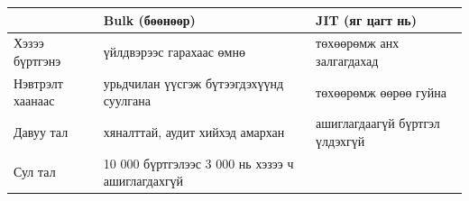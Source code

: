 \begingroup\scriptsize\begin{longtable}[]{@{}lll@{}}
\toprule
\begin{minipage}[b]{0.30\columnwidth}\raggedright
\strut
\end{minipage} & \begin{minipage}[b]{0.30\columnwidth}\raggedright
\textbf{Bulk (бөөнөөр)}\strut
\end{minipage} & \begin{minipage}[b]{0.30\columnwidth}\raggedright
\textbf{JIT (яг цагт нь)}\strut
\end{minipage}\tabularnewline
\midrule
\endhead
\begin{minipage}[t]{0.30\columnwidth}\raggedright
Хэзээ бүртгэнэ\strut
\end{minipage} & \begin{minipage}[t]{0.30\columnwidth}\raggedright
үйлдвэрээс гарахаас өмнө\strut
\end{minipage} & \begin{minipage}[t]{0.30\columnwidth}\raggedright
төхөөрөмж анх залгагдахад\strut
\end{minipage}\tabularnewline
\begin{minipage}[t]{0.30\columnwidth}\raggedright
Нэвтрэлт хаанаас\strut
\end{minipage} & \begin{minipage}[t]{0.30\columnwidth}\raggedright
урьдчилан үүсгэж бүтээгдэхүүнд суулгана\strut
\end{minipage} & \begin{minipage}[t]{0.30\columnwidth}\raggedright
төхөөрөмж өөрөө гуйна\strut
\end{minipage}\tabularnewline
\begin{minipage}[t]{0.30\columnwidth}\raggedright
Давуу тал\strut
\end{minipage} & \begin{minipage}[t]{0.30\columnwidth}\raggedright
хяналттай, аудит хийхэд амархан\strut
\end{minipage} & \begin{minipage}[t]{0.30\columnwidth}\raggedright
ашиглагдаагүй бүртгэл үлдэхгүй\strut
\end{minipage}\tabularnewline
\begin{minipage}[t]{0.30\columnwidth}\raggedright
Сул тал\strut
\end{minipage} & \begin{minipage}[t]{0.30\columnwidth}\raggedright
10 000 бүртгэлээс 3 000 нь хэзээ ч ашиглагдахгүй\strut
\end{minipage} & \begin{minipage}[t]{0.30\columnwidth}\raggedright

\end{minipage}
\end{longtable}
